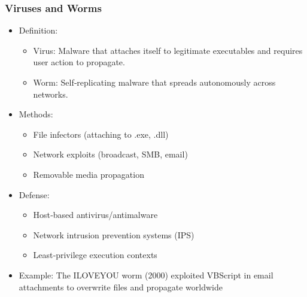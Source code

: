 \documentclass[11pt]{article}
\begin{document}
\subsubsection{Viruses and Worms}
\label{sec:org7f72e8d}
\begin{itemize}
\item Definition:
\begin{itemize}
\item Virus: Malware that attaches itself to legitimate executables and requires user action to propagate.
\item Worm: Self‑replicating malware that spreads autonomously across networks.
\end{itemize}
\item Methods:
\begin{itemize}
\item File infectors (attaching to .exe, .dll)
\item Network exploits (broadcast, SMB, email)
\item Removable media propagation
\end{itemize}
\item Defense:
\begin{itemize}
\item Host‑based antivirus/antimalware
\item Network intrusion prevention systems (IPS)
\item Least‑privilege execution contexts
\end{itemize}
\item Example: The ILOVEYOU worm (2000) exploited VBScript in email attachments to overwrite files and propagate worldwide
\end{itemize}
\end{document}

